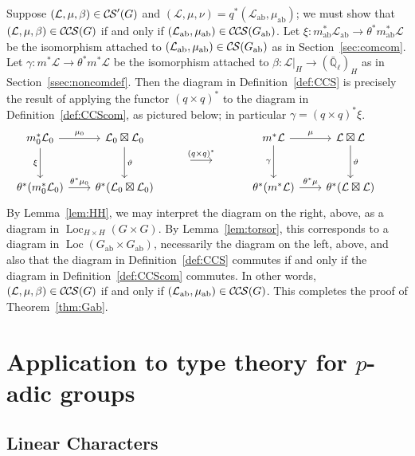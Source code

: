 \documentclass[10pt]{amsart}
\theoremstyle{plain}
\theoremstyle{definition}
\newcommand{\EE}{\mathbb{\bar Q}_\ell}
\DeclareMathOperator{\Loc}{Loc}
\newcommand{\ab}{_{\operatorname{ab}}}
\newcommand{\cs}[1]{{\mathcal{#1}}}
\newcommand{\CS}{{\mathcal{C\hskip-0.8pt S}}}
\newcommand{\CCS}{{\mathcal{C\hskip-.8pt C\hskip-0.8pt S}}}
\begin{document}
Suppose $(\cs{L},\mu,\beta)\in \CS'(G)$ and $(\cs{L},\mu,\nu) = q^*(\cs{L}\ab,\mu\ab)$;
we must show that $(\cs{L},\mu,\beta)\in \CCS(G)$ if and only if $(\cs{L}\ab,\mu\ab)\in \CCS(G\ab)$.
Let $\xi : m\ab^*\cs{L}\ab \to \theta^* m\ab^*\cs{L}$ be the isomorphism attached to $(\cs{L}\ab,\mu\ab)\in \CS(G\ab)$ as in Section~\ref{sec:comcom}.
Let $\gamma : m^*\cs{L} \to \theta^* m^*\cs{L}$ be the isomorphism attached to $\beta : \cs{L}\vert_{H} \to (\EE)_{H}$ as in Section~\ref{ssec:noncomdef}.
Then the diagram in Definition~\ref{def:CCS} is precisely the result of applying the functor $(q\times q)^*$ to the diagram in Definition~\ref{def:CCScom}, as pictured below; 
in particular $\gamma = (q\times q)^* \xi$.
  \[
  \begin{tikzcd}[row sep=10, column sep = 20]
   m_0^*\cs{L}_0 \arrow{dd}[swap]{\xi} \arrow{r}{\mu_0} 
   & \cs{L}_0\boxtimes\cs{L}_0 \arrow{dd}{\vartheta}
&&&   m^*\cs{L} \arrow{dd}[swap]{\gamma} \arrow{r}{\mu} 
 & \cs{L}\boxtimes\cs{L} \arrow{dd}{\vartheta}\\
 && \arrow{r}{(q\times q)^*}  &\ & & &\\ 
   \theta^*(m_0^*\cs{L}_0) \arrow{r}{{\theta}^*\mu_0} 
 &  \theta^*(\cs{L}_0\boxtimes\cs{L}_0)
&&&   \theta^*(m^*\cs{L}) \arrow{r}{{\theta}^*\mu} 
&  \theta^*(\cs{L}\boxtimes\cs{L})
  \end{tikzcd}
\]
By Lemma~\ref{lem:HH}, we may interpret the diagram on the right, above, as a diagram in $\Loc_{H\times H}(G\times G)$.
By Lemma~\ref{lem:torsor}, this corresponds to a diagram in $\Loc(G\ab\times G\ab)$, necessarily the diagram on the left, above, and also that the diagram in Definition~\ref{def:CCS} commutes if and only if the diagram in Definition~\ref{def:CCScom} commutes. 
In other words, $(\cs{L},\mu,\beta)\in \CCS(G)$
if and only if $(\cs{L}\ab,\mu\ab)\in \CCS(G)$.
This completes the proof of Theorem~\ref{thm:Gab}.


\section{Application to type theory for $p$-adic groups}

\iffalse
\subsection{Linear Characters}
\end{document}
